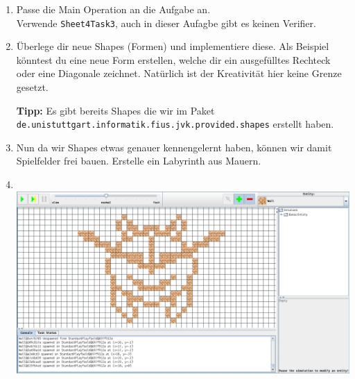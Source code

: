 
\begin{enumerate}
	\item
		Passe die Main Operation an die Aufgabe an.\\
		Verwende \lstinline{Sheet4Task3}, auch in dieser Aufagbe gibt es keinen Verifier.

	\item
		Überlege dir neue Shapes (Formen) und implementiere diese.
		Als Beispiel könntest du eine neue Form erstellen, welche dir ein ausgefülltes Rechteck oder eine Diagonale zeichnet.
		Natürlich ist der Kreativität hier keine Grenze gesetzt.

		\textbf{Tipp:} Es gibt bereits Shapes die wir im Paket \lstinline{de.unistuttgart.informatik.fius.jvk.provided.shapes} erstellt haben.

	\item
		Nun da wir Shapes etwas genauer kennengelernt haben, können wir damit Spielfelder frei bauen.
		Erstelle ein Labyrinth aus Mauern.

	\item
		\\
		\includegraphics[width=\linewidth]{./figures/playfield.png}

\end{enumerate}

\newpage

